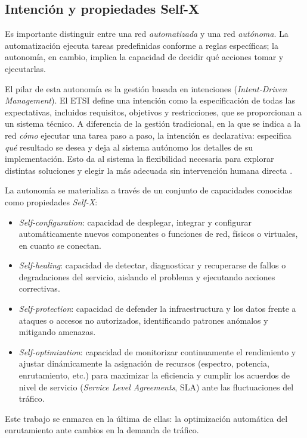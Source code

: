 \subsection{Intención y propiedades Self-X}

Es importante distinguir entre una red \textit{automatizada} y una red \textit{autónoma}. La automatización ejecuta tareas predefinidas conforme a reglas específicas; la autonomía, en cambio, implica la capacidad de decidir qué acciones tomar y ejecutarlas.

El pilar de esta autonomía es la gestión basada en intenciones (\textit{Intent-Driven Management}). El ETSI define una intención como la especificación de todas las expectativas, incluidos requisitos, objetivos y restricciones, que se proporcionan a un sistema técnico. A diferencia de la gestión tradicional, en la que se indica a la red \textit{cómo} ejecutar una tarea paso a paso, la intención es declarativa: especifica \textit{qué} resultado se desea y deja al sistema autónomo los detalles de su implementación. Esto da al sistema la flexibilidad necesaria para explorar distintas soluciones y elegir la más adecuada sin intervención humana directa \cite{etsi_zsm011}.

La autonomía se materializa a través de un conjunto de capacidades conocidas como propiedades \textit{Self-X}:

\begin{itemize}
	\item \textit{Self-configuration}: capacidad de desplegar, integrar y configurar automáticamente nuevos componentes o funciones de red, físicos o virtuales, en cuanto se conectan.
	\item \textit{Self-healing}: capacidad de detectar, diagnosticar y recuperarse de fallos o degradaciones del servicio, aislando el problema y ejecutando acciones correctivas.
	\item \textit{Self-protection}: capacidad de defender la infraestructura y los datos frente a ataques o accesos no autorizados, identificando patrones anómalos y mitigando amenazas.
	\item \textit{Self-optimization}: capacidad de monitorizar continuamente el rendimiento y ajustar dinámicamente la asignación de recursos (espectro, potencia, enrutamiento, etc.) para maximizar la eficiencia y cumplir los acuerdos de nivel de servicio (\textit{Service Level Agreements}, SLA) ante las fluctuaciones del tráfico.
\end{itemize}

Este trabajo se enmarca en la última de ellas: la optimización automática del enrutamiento ante cambios en la demanda de tráfico.

